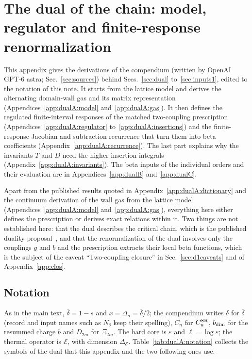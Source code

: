 \documentclass[11pt,a4paper]{article}
\numberwithin{equation}{section}
\newcommand{\De}{\Delta_{\mathcal E}}
\newcommand{\Ds}{\Delta_\sigma}
\newcommand{\CSR}{C^{\rm SR}}
\newcommand{\db}{\bar\delta}
\begin{document}
\section{The dual of the chain: model, regulator and finite-response renormalization}\label{app:dualA}
This appendix gives the derivations of the compendium (written by OpenAI GPT-6 astra; Sec.~\ref{sec:sources})
behind Secs.~\ref{sec:dual} to~\ref{sec:inputs1}, edited to the notation of this note. It starts from the lattice
model and derives the alternating domain-wall gas and its matrix representation
(Appendices~\ref{app:dualA:model} and~\ref{app:dualA:gas}). It then defines the regulated finite-interval responses
of the matched two-coupling prescription (Appendices~\ref{app:dualA:regulator} to~\ref{app:dualA:insertions}) and
the finite-response Jacobian and subtraction recurrence that turn them into beta coefficients
(Appendix~\ref{app:dualA:recurrence}). The last part explains why the invariants $T$ and $D$ need the
higher-insertion integrals (Appendix~\ref{app:dualA:invariants}). The beta inputs of the individual orders and their
evaluation are in Appendices~\ref{app:dualB} and~\ref{app:dualC}.

Apart from the published results quoted in Appendix~\ref{app:dualA:dictionary} and the continuum derivation of the
wall gas from the lattice model (Appendices~\ref{app:dualA:model} and~\ref{app:dualA:gas}), everything here either
defines the prescription or derives exact relations within it. Two things are not established here: that the dual
describes the critical chain, which is the published duality proposal~\cite{Benedetti:2024wgx,Benedetti:2025nzp}, and
that the renormalization of the dual involves only the couplings $g$ and $b$ and the prescription extracts their local
beta functions, which is the subject of the caveat ``Two-coupling closure'' in Sec.~\ref{sec:d1caveats} and of
Appendix~\ref{app:clos}.

\subsection{Notation}\label{app:dualA:notation}
As in the main text, $\db=1-s$ and $x=\Ds=\db/2$; the compendium writes $\delta$ for $\db$ (record and input names
such as $N_\delta$ keep their spelling), $C_n$ for $\CSR_n$, $b_{\rm dim}$ for the resummed charge $b$ and
$D_{2m}$ for $\Xi_{2m}$. The hard core is $\varepsilon$ and
$\ell=\log\varepsilon$; the thermal operator is $\mathcal E$, with dimension $\De$. Table~\ref{tab:dualA:notation}
collects the symbols of the dual that this appendix and the two following ones use.
\end{document}
